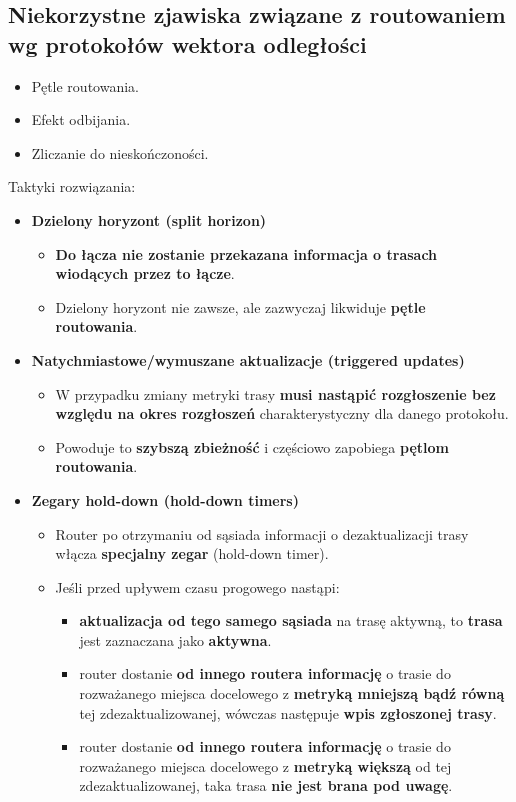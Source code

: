\documentclass[a4paper]{article}
\begin{document}
\subsection{Niekorzystne zjawiska związane z routowaniem wg protokołów wektora odległości}
\begin{itemize}
    \item Pętle routowania.
    \item Efekt odbijania.
    \item Zliczanie do nieskończoności.
\end{itemize}

Taktyki rozwiązania:
\begin{itemize}
    \item \textbf{Dzielony horyzont (split horizon)}
    \begin{itemize}
        \item \textbf{Do łącza nie zostanie przekazana informacja o trasach wiodących przez to łącze}.
        \item Dzielony horyzont nie zawsze, ale zazwyczaj likwiduje \textbf{pętle routowania}.
    \end{itemize}

    \item \textbf{Natychmiastowe/wymuszane aktualizacje (triggered updates)}
    \begin{itemize}
        \item W przypadku zmiany metryki trasy \textbf{musi nastąpić rozgłoszenie bez względu na okres
    rozgłoszeń} charakterystyczny dla danego protokołu.
        \item Powoduje to \textbf{szybszą zbieżność} i częściowo zapobiega \textbf{pętlom routowania}.
    \end{itemize}

    \item \textbf{Zegary hold-down (hold-down timers)}
    \begin{itemize}
        \item Router po otrzymaniu od sąsiada informacji o dezaktualizacji trasy włącza \textbf{specjalny zegar} (hold-down timer).
        \item Jeśli przed upływem czasu progowego nastąpi:
        \begin{itemize}
            \item \textbf{aktualizacja od tego samego sąsiada} na trasę aktywną, to \textbf{trasa} jest zaznaczana jako \textbf{aktywna}.
            \item router dostanie \textbf{od innego routera informację} o trasie do rozważanego miejsca docelowego z \textbf{metryką mniejszą bądź równą} tej zdezaktualizowanej, wówczas następuje \textbf{wpis zgłoszonej trasy}.
            \item router dostanie \textbf{od innego routera informację} o trasie do rozważanego miejsca docelowego z \textbf{metryką większą} od tej zdezaktualizowanej, taka trasa \textbf{nie jest brana pod uwagę}.
        \end{itemize}
    \end{itemize}
\end{itemize}
\end{document}

